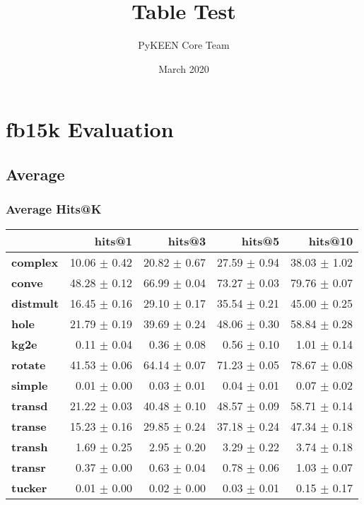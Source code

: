 \documentclass{article}
\title{Table Test}
\author{PyKEEN Core Team}
\date{March 2020}
\begin{document}
\section{fb15k Evaluation}
    \subsection{Average}
    \subsubsection{Average Hits@K}
    \begin{center}
    \begin{tabular}{lrrrr}
\toprule
{} &        hits@1 &        hits@3 &        hits@5 &       hits@10 \\
\midrule
\textbf{complex } &  10.06 $\pm$ 0.42 &  20.82 $\pm$ 0.67 &  27.59 $\pm$ 0.94 &  38.03 $\pm$ 1.02 \\
\textbf{conve   } &  48.28 $\pm$ 0.12 &  66.99 $\pm$ 0.04 &  73.27 $\pm$ 0.03 &  79.76 $\pm$ 0.07 \\
\textbf{distmult} &  16.45 $\pm$ 0.16 &  29.10 $\pm$ 0.17 &  35.54 $\pm$ 0.21 &  45.00 $\pm$ 0.25 \\
\textbf{hole    } &  21.79 $\pm$ 0.19 &  39.69 $\pm$ 0.24 &  48.06 $\pm$ 0.30 &  58.84 $\pm$ 0.28 \\
\textbf{kg2e    } &   0.11 $\pm$ 0.04 &   0.36 $\pm$ 0.08 &   0.56 $\pm$ 0.10 &   1.01 $\pm$ 0.14 \\
\textbf{rotate  } &  41.53 $\pm$ 0.06 &  64.14 $\pm$ 0.07 &  71.23 $\pm$ 0.05 &  78.67 $\pm$ 0.08 \\
\textbf{simple  } &   0.01 $\pm$ 0.00 &   0.03 $\pm$ 0.01 &   0.04 $\pm$ 0.01 &   0.07 $\pm$ 0.02 \\
\textbf{transd  } &  21.22 $\pm$ 0.03 &  40.48 $\pm$ 0.10 &  48.57 $\pm$ 0.09 &  58.71 $\pm$ 0.14 \\
\textbf{transe  } &  15.23 $\pm$ 0.16 &  29.85 $\pm$ 0.24 &  37.18 $\pm$ 0.24 &  47.34 $\pm$ 0.18 \\
\textbf{transh  } &   1.69 $\pm$ 0.25 &   2.95 $\pm$ 0.20 &   3.29 $\pm$ 0.22 &   3.74 $\pm$ 0.18 \\
\textbf{transr  } &   0.37 $\pm$ 0.00 &   0.63 $\pm$ 0.04 &   0.78 $\pm$ 0.06 &   1.03 $\pm$ 0.07 \\
\textbf{tucker  } &   0.01 $\pm$ 0.00 &   0.02 $\pm$ 0.00 &   0.03 $\pm$ 0.01 &   0.15 $\pm$ 0.17 \\
\bottomrule
\end{tabular}

    \end{center}
\end{document}
